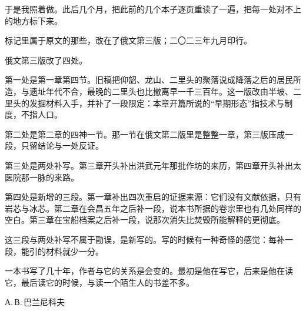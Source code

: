 于是我照着做。此后几个月，把此前的几个本子逐页重读了一遍，把每一处对不上的地方标下来。

标记里属于原文的那些，改在了俄文第三版；二〇二三年九月印行。

俄文第三版改了四处。

第一处是第一章第四节。旧稿把仰韶、龙山、二里头的聚落说成降落之后的居民所造，与遗址年代不合，最晚的二里头也比撤离早一千三百年。这一版改由半坡、二里头的发掘材料入手，并补了一段限定：本章开篇所说的“早期形态”指技术与制度，不指人口。

第二处是第二章的四神一节。那一节在俄文第二版里是整整一章，第三版压成一段，只留结论与一处反证。

第三处是两处补写。第三章开头补出洪武元年那批作坊的来历，第四章开头补出太医院那一脉的来路。

第四处是新增的三段。第一章补出四次重启的证据来源：它们没有文献依据，只有岩芯与冰芯。第二章在会昌五年之后补一段，说本书所据的卷宗里也有几处同样的空白。第三章在宝船档案之后补一段，说那次消失比焚毁所能解释的更彻底。

这三段与两处补写不属于勘误，是新写的。写的时候有一种奇怪的感觉：每补一段，能引的材料就少一分。

一本书写了几十年，作者与它的关系是会变的。最初是他在写它，后来是他在读它，最后读它的时候，与读一个陌生人的书差不多。

\vspace{2mm}
\begin{flushright}
{\small А.\,В.\,巴兰尼科夫}
\end{flushright}

\tocandfigs

